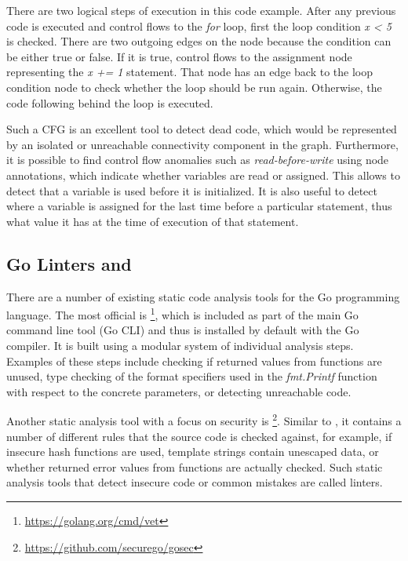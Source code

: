 

There are two logical steps of execution in this code example.
After any previous code is executed and control flows to the \textit{for} loop, first the loop condition \textit{x < 5}
is checked.
There are two outgoing edges on the node because the condition can be either true or false.
If it is true, control flows to the assignment node representing the \textit{x += 1} statement.
That node has an edge back to the loop condition node to check whether the loop should be run again.
Otherwise, the code following behind the loop is executed.

Such a \acrshort{CFG} is an excellent tool to detect dead code, which would be represented by an isolated or unreachable
connectivity component in the graph.
Furthermore, it is possible to find control flow anomalies such as \textit{read-before-write} using node annotations,
which indicate whether variables are read or assigned.
This allows to detect that a variable is used before it is initialized.
It is also useful to detect where a variable is assigned for the last time before a particular statement, thus what
value it has at the time of execution of that statement.



\subsection{Go Linters \toolVet{} and \toolGosec{}}\label{subsec:background:static-code-analysis:linters}

There are a number of existing static code analysis tools for the Go programming language.
The most official is \toolVet{}\footnote{\url{https://golang.org/cmd/vet}}, which is included as part of the main Go
command line tool (Go \acrshort{CLI}) and thus is installed by default with the Go compiler.
It is built using a modular system of individual analysis steps.
Examples of these steps include checking if returned values from functions are unused, type checking of the format
specifiers used in the \textit{fmt.Printf} function with respect to the concrete parameters, or detecting unreachable
code.

Another static analysis tool with a focus on security is \toolGosec{}\footnote{\url{https://github.com/securego/gosec}}.
Similar to \toolVet{}, it contains a number of different rules that the source code is checked against, for example, if
insecure hash functions are used, template strings contain unescaped data, or whether returned error values from
functions are actually checked.
Such static analysis tools that detect insecure code or common mistakes are called linters.
